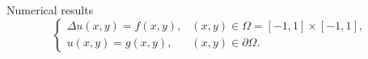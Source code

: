 \documentclass{beamer}
\begin{document}
\begin{frame}{Numerical results}
\begin{equation*}
	\begin{cases} \Delta u(x,y) = f(x,y), & (x,y) \in \Omega = [-1,1] \times [-1,1], \\
		u(x,y) = g(x,y), & (x,y) \in \partial \Omega. %
	\end{cases}
\end{equation*}
\begin{figure}
	\label{fig: compare altAOSM}
\end{figure}
\end{frame}
\end{document}
